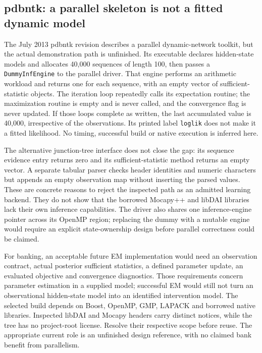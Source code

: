 \subsection{pdbntk: a parallel skeleton is not a fitted dynamic model}
\label{rel19:pdbntk}

The July 2013 pdbntk revision describes a parallel dynamic-network toolkit,
but the actual demonstration path is unfinished. Its executable declares
hidden-state models and allocates 40,000 sequences of length 100, then passes
a \texttt{DummyInfEngine} to the parallel driver. That engine performs an
arithmetic workload and returns one for each sequence, with an empty vector
of sufficient-statistic objects. The iteration loop repeatedly calls its
expectation routine; the maximization routine is empty and is never called,
and the convergence flag is never updated. If those loops complete as written,
the last accumulated value is 40,000, irrespective of the observations. Its
printed label \texttt{loglik} does not make it a fitted likelihood. No timing,
successful build or native execution is inferred here. \citep{rel19pdbntk,rel19dbnwitness}

The alternative junction-tree interface does not close the gap: its sequence
evidence entry returns zero and its sufficient-statistic method returns an
empty vector. A separate tabular parser checks header identities and numeric
characters but appends an empty observation map without inserting the parsed
values. These are concrete reasons to reject the inspected path as an admitted
learning backend. They do not show that the borrowed Mocapy++ and libDAI
libraries lack their own inference capabilities. The driver also shares one
inference-engine pointer across its OpenMP region; replacing the dummy with
a mutable engine would require an explicit state-ownership design before
parallel correctness could be claimed. \citep{rel19pdbntk}

For banking, an acceptable future EM implementation would need an observation
contract, actual posterior sufficient statistics, a defined parameter update,
an evaluated objective and convergence diagnostics. Those requirements concern
parameter estimation in a supplied model; successful EM would still not turn
an observational hidden-state model into an identified intervention model.
The selected build depends on Boost, OpenMP, GMP, LAPACK and borrowed native
libraries. Inspected libDAI and Mocapy headers carry distinct notices, while
the tree has no project-root license. Resolve their respective scope before
reuse. The appropriate current role is an unfinished design reference, with
no claimed bank benefit from parallelism. \citep{rel19pdbntk}

